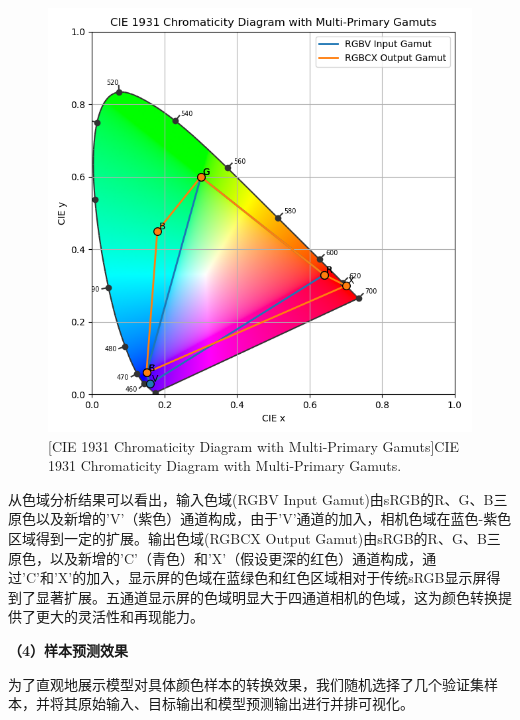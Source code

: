 \begin{figure}[H]
\centering
{}
\includegraphics[width=0.67\columnwidth]{figures/色度图.png}
[CIE 1931 Chromaticity Diagram with Multi-Primary Gamuts]{CIE 1931 Chromaticity Diagram with Multi-Primary Gamuts.}
\label{figure2: chromaticity_diagram}
\end{figure}

从色域分析结果可以看出，输入色域(RGBV Input Gamut)由sRGB的R、G、B三原色以及新增的'V'（紫色）通道构成，由于'V'通道的加入，相机色域在蓝色-紫色区域得到一定的扩展。输出色域(RGBCX Output Gamut)由sRGB的R、G、B三原色，以及新增的'C'（青色）和'X'（假设更深的红色）通道构成，通过'C'和'X'的加入，显示屏的色域在蓝绿色和红色区域相对于传统sRGB显示屏得到了显著扩展。五通道显示屏的色域明显大于四通道相机的色域，这为颜色转换提供了更大的灵活性和再现能力。

\noindent\textbf{（4）样本预测效果}

为了直观地展示模型对具体颜色样本的转换效果，我们随机选择了几个验证集样本，并将其原始输入、目标输出和模型预测输出进行并排可视化。

